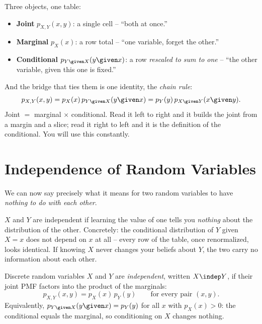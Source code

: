 \begin{focusbox}
Three objects, one table:
\begin{itemize}
  \item \textbf{Joint} $p_{X,Y}(x,y)$: a single cell -- ``both at once.''
  \item \textbf{Marginal} $p_X(x)$: a row total -- ``one variable, forget the
        other.''
  \item \textbf{Conditional} $p_{Y\given X}(y\given x)$: a row \emph{rescaled to
        sum to one} -- ``the other variable, given this one is fixed.''
\end{itemize}
And the bridge that ties them is one identity, the \emph{chain rule}:
\[
  p_{X,Y}(x,y) = p_X(x)\, p_{Y\given X}(y\given x)
              = p_Y(y)\, p_{X\given Y}(x\given y).
\]
Joint $=$ marginal $\times$ conditional. Read it left to right and it builds the
joint from a margin and a slice; read it right to left and it is the definition of
the conditional. You will use this constantly.
\end{focusbox}

\section{Independence of Random Variables}
\label{ch13:independence}

We can now say precisely what it means for two random variables to have
\emph{nothing to do with each other}.

\begin{intuitionbox}
$X$ and $Y$ are independent if learning the value of one tells you \emph{nothing}
about the distribution of the other. Concretely: the conditional distribution of
$Y$ given $X=x$ does not depend on $x$ at all -- every row of the table, once
renormalized, looks identical. If knowing $X$ never changes your beliefs about
$Y$, the two carry no information about each other.
\end{intuitionbox}

\begin{definition}
\label{ch13:def-indep}
Discrete random variables $X$ and $Y$ are \emph{independent}, written
$X \indep Y$, if their joint PMF factors into the product of the marginals:
\[
  p_{X,Y}(x,y) = p_X(x)\, p_Y(y) \qquad \text{for every pair } (x,y).
\]
Equivalently, $p_{Y\given X}(y\given x) = p_Y(y)$ for all $x$ with $p_X(x)>0$:
the conditional equals the marginal, so conditioning on $X$ changes nothing.
\end{definition}

